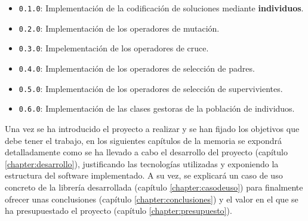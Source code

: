 \begin{itemize}
    \item \texttt{0.1.0}: Implementación de la codificación de soluciones mediante \textbf{individuos}.
    \item \texttt{0.2.0}: Implementación de los operadores de mutación.
    \item \texttt{0.3.0}: Impelementación de los operadores de cruce.
    \item \texttt{0.4.0}: Implementación de los operadores de selección de padres. 
    \item \texttt{0.5.0}: Implementación de los operadores de selección de supervivientes.
    \item \texttt{0.6.0}: Implementación de las clases gestoras de la población de individuos.
\end{itemize}

Una vez se ha introducido el proyecto a realizar y se han fijado los objetivos que debe tener el trabajo, en los siguientes capítulos de la memoria se expondrá detalladamente como se ha llevado a cabo el desarrollo del proyecto (capítulo \ref{chapter:desarrollo}), justificando las tecnologías utilizadas y exponiendo la estructura del software implementado. A su vez, se explicará un caso de uso concreto de la librería desarrollada (capítulo \ref{chapter:casodeuso}) para finalmente ofrecer unas conclusiones (capítulo \ref{chapter:conclusiones}) y el valor en el que se ha presupuestado el proyecto (capítulo \ref{chapter:presupuesto}).